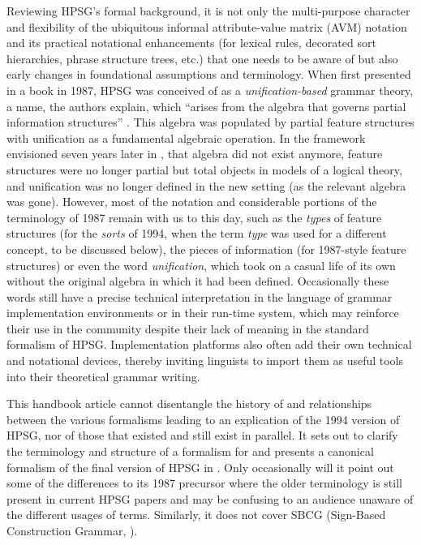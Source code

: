 \documentclass[output=paper
                ,modfonts
                ,nonflat
	        ,collection
	        ,collectionchapter
	        ,collectiontoclongg
 	        ,biblatex
                ,babelshorthands
                ,newtxmath
                ,draftmode
                ,colorlinks, citecolor=brown
]{./langsci/langscibook}
\begin{document}
{Reviewing HPSG's formal background,
it is not only the multi-purpose character and flexibility of the ubiquitous informal attribute-value matrix (AVM) notation and its
practical notational enhancements (for lexical rules, decorated sort
hierarchies, phrase structure trees, etc.) that one needs to be
aware of but also early changes in
foundational assumptions and terminology.
When first presented in a book in 1987, HPSG was conceived of as a
\emph{unification-based} grammar theory, a name, the authors
explain, which ``arises from the algebra that governs partial
information structures'' \citep[7]{PollardSag1987}. This algebra was
populated by partial feature structures with unification as a
fundamental algebraic operation. In the framework envisioned seven
years later in \citet{PollardSag1994},
that algebra did not exist anymore, feature structures were no longer
partial but total objects in models of a logical theory, and
unification was no longer defined in the new setting (as the relevant
algebra was gone). However, most of the notation and considerable
portions of the terminology of 1987 remain with us to this day, such as the
\emph{types} of feature structures (for the \emph{sorts} of 1994,
when the term \emph{type} was used for a different concept, to be
discussed below), the pieces of information (for 1987-style feature
structures) or even the word \emph{unification}, which took on a
casual life of its own without the original algebra in
which it had been defined. Occasionally these words still have a
precise technical interpretation in the language of grammar
implementation environments or in their run-time system, which may
reinforce their use in the community despite their lack of meaning in
the standard formalism of HPSG. Implementation platforms also often add
their own technical and notational devices, thereby
inviting linguists to import them as useful tools into their theoretical grammar
writing.



This handbook article cannot disentangle the history of and relationships
between the various formalisms leading to an explication of the
1994 version of HPSG, nor of those that existed and still exist in
parallel. It sets out to clarify the terminology and
structure of a formalism for \cite{PollardSag1994} and
presents a canonical formalism of the final version of
HPSG in \cite{PollardSag1994}. Only occasionally will it point out some of
the differences to its 1987 precursor where
the older terminology is still present in current HPSG papers and
may be confusing to an audience unaware of the different
usages of terms. Similarly, it does not cover SBCG (Sign-Based
Construction Grammar, ).

}
\end{document}
